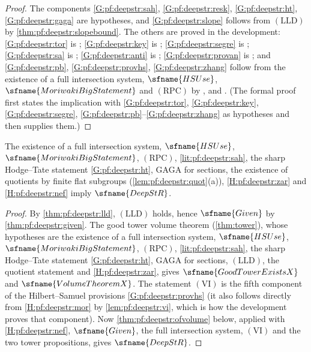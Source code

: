 \begin{proof}
The components \ref{G:pf:deepstr:sah}, \ref{G:pf:deepstr:resk}, \ref{G:pf:deepstr:ht}, \ref{G:pf:deepstr:gaga}
are hypotheses, and \ref{G:pf:deepstr:slope} follows from $\mathrm{(LLD)}$ by \cref{thm:pf:deepstr:slopebound}.
The others are proved in the development: \ref{G:pf:deepstr:tor} is
; \ref{G:pf:deepstr:key} is
; \ref{G:pf:deepstr:segre} is
; \ref{G:pf:deepstr:sa} is
; \ref{G:pf:deepstr:anti} is
; \ref{G:pf:deepstr:provan} is
; and \ref{G:pf:deepstr:pb}, \ref{G:pf:deepstr:provhs},
\ref{G:pf:deepstr:zhang} follow from the existence of a full intersection system, $\sfname{HSUse}$,
$\sfname{MoriwakiBigStatement}$ and $\mathrm{(RPC)}$ by
,
 and
. (The formal proof first states the
implication with \ref{G:pf:deepstr:tor}, \ref{G:pf:deepstr:key}, \ref{G:pf:deepstr:segre},
\ref{G:pf:deepstr:pb}--\ref{G:pf:deepstr:zhang} as hypotheses and then supplies them.)
\end{proof}

\begin{theorem}\label{thm:pf:deepstr:ofuse}
The existence of a full intersection system, $\sfname{HSUse}$, $\sfname{MoriwakiBigStatement}$, $\mathrm{(RPC)}$,
\cref{lit:pf:deepstr:sah}, the sharp Hodge--Tate statement \ref{G:pf:deepstr:ht}, GAGA for sections, the existence of quotients by finite
flat subgroups (\cref{lem:pf:deepstr:quot}(a)), \ref{H:pf:deepstr:zar} and \ref{H:pf:deepstr:nef} imply
$\sfname{DeepStR}$. 
\end{theorem}

\begin{proof}
By \cref{thm:pf:deepstr:lld}, $\mathrm{(LLD)}$ holds, hence $\sfname{Given}$ by \cref{thm:pf:deepstr:given}.
The good tower volume theorem 
(\cref{thm:tower}), whose hypotheses are the existence of a full intersection system, $\sfname{HSUse}$,
$\sfname{MoriwakiBigStatement}$, $\mathrm{(RPC)}$, \cref{lit:pf:deepstr:sah}, the sharp Hodge--Tate statement \ref{G:pf:deepstr:ht},
GAGA for sections, $\mathrm{(LLD)}$, the quotient statement and \ref{H:pf:deepstr:zar}, gives
$\sfname{GoodTowerExistsX}$ and $\sfname{VolumeTheoremX}$. The statement $\mathrm{(VI)}$ is the fifth
component of the Hilbert--Samuel provisions \ref{G:pf:deepstr:provhs} (it also follows directly from
\ref{H:pf:deepstr:mor} by \cref{lem:pf:deepstr:vi}, which is how the development proves that component). Now \cref{thm:pf:deepstr:ofvolume} below,
applied with \ref{H:pf:deepstr:nef}, $\sfname{Given}$, the full intersection system, $\mathrm{(VI)}$ and the
two tower propositions, gives $\sfname{DeepStR}$.
\end{proof}

